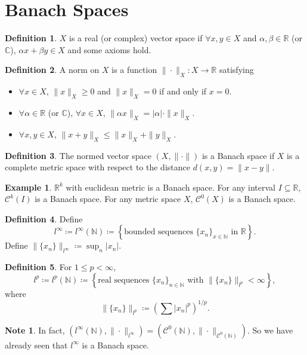 \documentclass[12pt]{article}
\theoremstyle{plain}
\theoremstyle{definition}
\newtheorem*{defn}{Definition}
\newtheorem*{eg}{Example}
\newtheorem*{note}{Note}
\begin{document}
\section*{Banach Spaces}
\begin{defn}
    $X$ is a real (or complex) vector space if $\forall x,y\in X$ and $\alpha, \beta\in\mathbb{R}$ (or $\mathbb{C}$),
    $\alpha x + \beta y\in X$ and some axioms hold.
\end{defn}

\begin{defn}
    A norm on $X$ is a function $\|\cdot\|_X: X\rightarrow \mathbb{R}$ satisfying 
    \begin{itemize}
        \item $\forall x\in X$, $\|x\|_X\geq 0$ and $\|x\|_X=0$ if and only if $x=0$.
        \item $\forall \alpha\in\mathbb{R}$ (or $\mathbb{C}$), $\forall x\in X$, $\|\alpha x\|_X =
            |\alpha|\cdot\|x\|_X$.
        \item $\forall x, y \in X$, $\|x+y\|_X\leq \|x\|_X + \|y\|_X$.
    \end{itemize}
\end{defn}

\begin{defn}
    The normed vector space $(X, \|\cdot\|)$ is a Banach space if $X$ is a complete metric space with respect to the
    distance $d(x, y) = \|x-y\|$.
\end{defn}
\begin{eg}
    $\mathbb{R}^k$ with euclidean metric is a Banach space.
    For any interval $I\subseteq \mathbb{R}$, $\mathcal{C}^k(I)$ is a Banach space.
    For any metric space $X$, $\mathcal{C}^0(X)$ is a Banach space.
\end{eg}

\begin{defn}
    Define 
    \[l^\infty \coloneqq l^\infty (\mathbb{N}) \coloneqq \left\{\text{bounded sequences }\{x_n\}_{x\in \mathbb{N}}\text{ in
    }\mathbb{R}\right\}.\]
    Define $\|\{x_n\}\|_{l^\infty} \coloneqq \sup_n |x_n|$.
\end{defn}

\begin{defn}
    For $1\leq p<\infty$, 
    \[
        l^p \coloneqq l^p(\mathbb{N}) \coloneqq \left\{\text{real sequences }\{x_n\}_{n\in\mathbb{N}}\text{ with } 
        \|\{x_n\}\|_{l^p} < \infty\right\},
    \]
    where
    \[
        \|\{x_n\}\|_{l^p}\coloneqq \left(\sum |x_n|^p\right)^{1/p}.
    \]
\end{defn}
\begin{note}
    In fact, $(l^\infty(\mathbb{N}), \|\cdot\|_{l^\infty}) = (\mathcal{C}^0(\mathbb{N}), \|\cdot
    \|_{\mathcal{C}^0(\mathbb{N})})$. 
    So we have already seen that $l^\infty$ is a Banach space.
\end{note}
\end{document}

